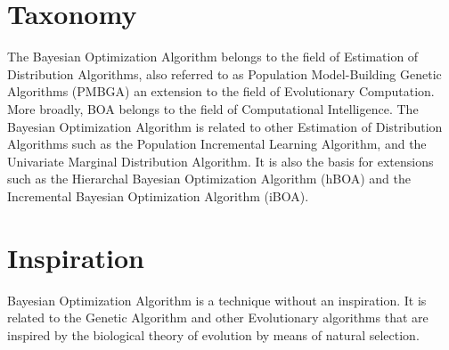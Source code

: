 \documentclass[a4paper, 11pt]{article}
\begin{document}
\section{Taxonomy}
\label{sec:taxonomy}
The Bayesian Optimization Algorithm belongs to the field of Estimation of Distribution Algorithms, also referred to as Population Model-Building Genetic Algorithms (PMBGA) an extension to the field of Evolutionary Computation. More broadly, BOA belongs to the field of Computational Intelligence.
The Bayesian Optimization Algorithm is related to other Estimation of Distribution Algorithms such as the Population Incremental Learning Algorithm, and the Univariate Marginal Distribution Algorithm.
It is also the basis for extensions such as the Hierarchal Bayesian Optimization Algorithm (hBOA) and the Incremental Bayesian Optimization Algorithm (iBOA).

\section{Inspiration}
\label{sec:inspiration}
Bayesian Optimization Algorithm is a technique without an inspiration. It is related to the Genetic Algorithm and other Evolutionary algorithms that are inspired by the biological theory of evolution by means of natural selection.
\end{document}
